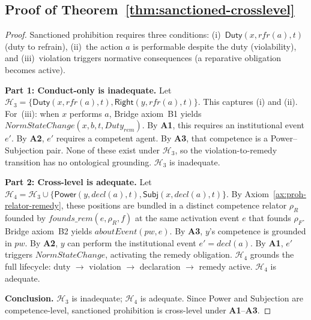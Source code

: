 \documentclass{IOS-Book-Article}
\newcommand{\Duty}{\mathsf{Duty}}            %
\newcommand{\Right}{\mathsf{Right}}          %
\newcommand{\Power}{\mathsf{Power}}          %
\newcommand{\Subj}{\mathsf{Subj}}       %
\theoremstyle{definition}
\begin{document}
\subsection*{Proof of Theorem~\ref{thm:sanctioned-crosslevel}}
\label{app:proof:sanctioned-crosslevel}
\begin{proof}
Sanctioned prohibition requires three conditions:
(i)~$\Duty(x,\mathit{rfr}(a),t)$ (duty to refrain),
(ii)~the action $a$ is performable despite the duty
(violability), and
(iii)~violation triggers normative consequences (a reparative
obligation becomes active).

\medskip\noindent\textbf{Part 1: Conduct-only is inadequate.}
Let $\mathcal{H}_3=\{\Duty(x,\mathit{rfr}(a),t),
\Right(y,\mathit{rfr}(a),t)\}$. This captures (i) and (ii).
For~(iii): when $x$ performs $a$, Bridge axiom~B1 yields
$\mathit{NormStateChange}(x,b,t,\mathit{Duty}_\mathit{rem})$.
By \textbf{A1}, this requires an institutional event $e'$.
By \textbf{A2}, $e'$ requires a competent agent.
By \textbf{A3}, that competence is a Power--Subjection pair.
None of these exist under $\mathcal{H}_3$, so the
violation-to-remedy transition has no ontological grounding.
$\mathcal{H}_3$ is inadequate.

\medskip\noindent\textbf{Part 2: Cross-level is adequate.}
Let $\mathcal{H}_4=\mathcal{H}_3\cup\{
\Power(y,\mathit{decl}(a),t),\Subj(x,\mathit{decl}(a),t)\}$.
By Axiom~\ref{ax:proh-relator-remedy}, these positions are
bundled in a distinct competence relator $\rho_R$ founded by
$\mathit{founds\_rem}(e,\rho_R,f)$ at the same activation event $e$
that founds $\rho_F$. Bridge axiom~B2
yields $\mathit{aboutEvent}(pw,e)$.
By \textbf{A3}, $y$'s competence is grounded in $pw$.
By \textbf{A2}, $y$ can perform the institutional event
$e'=\mathit{decl}(a)$. By \textbf{A1}, $e'$ triggers
$\mathit{NormStateChange}$, activating the remedy obligation.
$\mathcal{H}_4$ grounds the full lifecycle:
duty $\to$ violation $\to$ declaration $\to$ remedy active.
$\mathcal{H}_4$ is adequate.

\medskip\noindent\textbf{Conclusion.}
$\mathcal{H}_3$ is inadequate; $\mathcal{H}_4$ is adequate.
Since Power and Subjection are competence-level, sanctioned
prohibition is cross-level under \textbf{A1}--\textbf{A3}.
\end{proof}

\end{document}
